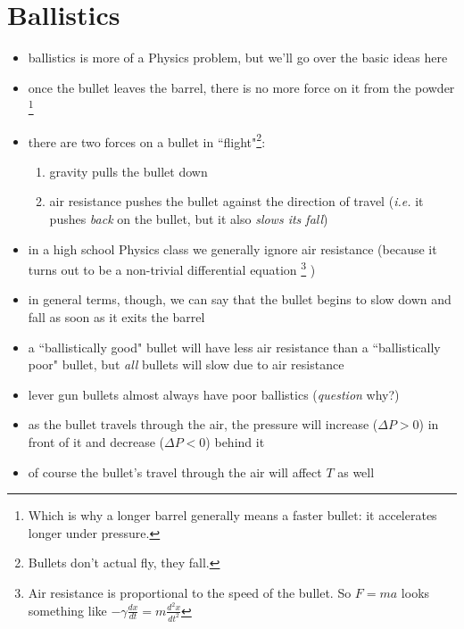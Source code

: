 \documentclass[11pt, oneside]{article}   	%
\begin{document}
\section{Ballistics}
\begin{itemize}
\item ballistics is more of a Physics problem, but we'll go over the basic ideas here
\item once the bullet leaves the barrel, there is no more force on it from the powder
\footnote{Which is why a longer barrel generally means a faster bullet: it accelerates longer under pressure.}
\item there are two forces on a bullet in ``flight"\footnote{Bullets don't actual fly, they fall.}:
\begin{enumerate}
\item gravity pulls the bullet down
\item air resistance pushes the bullet against the direction of travel (\emph{i.e.} it pushes \emph{back} on the bullet, but it also \emph{slows its fall})
\end{enumerate}
\item in a high school Physics class we generally ignore air resistance (because it turns out to be a non-trivial differential equation
\footnote{Air resistance is proportional to the speed of the bullet. So $F = m a$ looks something like $- \gamma \frac{dx}{dt} = m \frac{d^{2} x}{d t^{2}} $}  
)
\item in general terms, though, we can say that the bullet begins to slow down and fall as soon as it exits the barrel 
\item a ``ballistically good" bullet will have less air resistance than a ``ballistically poor" bullet, but \emph{all} bullets will slow due to air resistance
\item lever gun bullets almost always have poor ballistics (\emph{question} why?)
\item as the bullet travels through the air, the pressure will increase ($\Delta P > 0$) in front of it and decrease ($\Delta P < 0$) behind it
\item of course the bullet's travel through the air will affect $T$ as well
\end{itemize}


\nocite{wile-chem-2}


\end{document}
